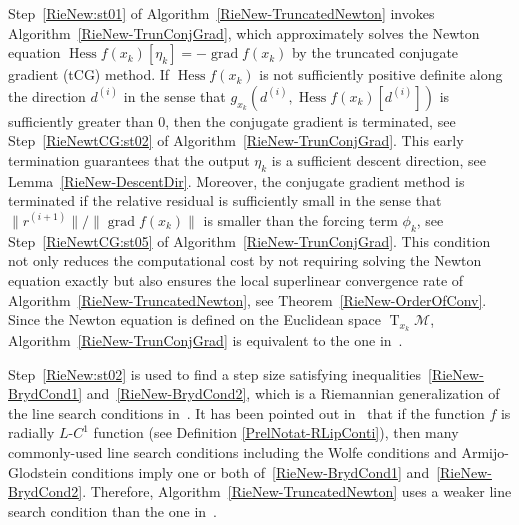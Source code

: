 \documentclass[11pt]{article}
\numberwithin{equation}{section}
\DeclareMathOperator{\T}{\mathrm{T}}
\DeclareMathOperator{\Hess}{\mathrm{Hess}}
\DeclareMathOperator{\grad}{\mathrm{grad}}
\begin{document}
Step~\ref{RieNew:st01} of Algorithm~\ref{RieNew-TruncatedNewton} invokes Algorithm~\ref{RieNew-TrunConjGrad}, which approximately solves the Newton equation $\Hess f(x_k) [\eta_k] = - \grad f(x_k)$ by the truncated conjugate gradient (tCG) method. 
If $\Hess f(x_k)$ is not sufficiently positive definite along the direction $d^{(i)}$ in the sense that $g_{x_k}(d^{(i)}, \Hess f(x_k) [d^{(i)}])$ is sufficiently greater than 0, then the conjugate gradient is terminated, see Step~\ref{RieNewtCG:st02} of Algorithm~\ref{RieNew-TrunConjGrad}. This early termination guarantees that the output $\eta_k$ is a sufficient descent direction, see Lemma~\ref{RieNew-DescentDir}. 
Moreover, the conjugate gradient method is terminated if the relative residual is sufficiently small in the sense that $\|r^{(i+1)}\| / \| \grad f(x_k)\|$ is smaller than the forcing term $\phi_k$, see Step~\ref{RieNewtCG:st05} of Algorithm~\ref{RieNew-TrunConjGrad}. This condition not only reduces the computational cost by not requiring solving the Newton equation exactly but also ensures the local superlinear convergence rate of Algorithm~\eqref{RieNew-TruncatedNewton}, see Theorem~\ref{RieNew-OrderOfConv}. 
Since the Newton equation is defined on the Euclidean space $\T_{x_k} \mathcal{M}$, Algorithm~\ref{RieNew-TrunConjGrad} is equivalent to the one in~\cite[Minor~Iteration]{dembo_truncated-newton_1983}. 

Step~\ref{RieNew:st02} is used to find a step size satisfying inequalities~\eqref{RieNew-BrydCond1} and~\eqref{RieNew-BrydCond2}, which is a Riemannian generalization of the line search conditions in~\cite{Byrd1989ATF}. It has been pointed out in~\cite{huang_riemannian_2018} that if the function $f$ is radially $L$-$C^1$ function (see Definition \ref{PrelNotat-RLipConti}), then many commonly-used line search conditions including the Wolfe conditions and Armijo-Glodstein conditions imply one or both of~\eqref{RieNew-BrydCond1} and~\eqref{RieNew-BrydCond2}. Therefore, Algorithm~\ref{RieNew-TruncatedNewton} uses a weaker line search condition than the one in~\cite{dembo_truncated-newton_1983}.
\end{document}
